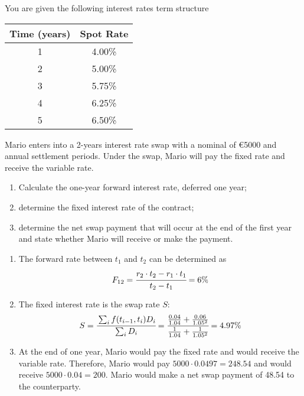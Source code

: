 \documentclass[12pt,a4paper]{exam}
\begin{document}
\begin{questions}
\question You are given the following interest rates term structure
\begin{center}
\begin{tabular}{|c|c|}
\hline
Time (years)& Spot Rate \\ \hline
1 & 4.00\% \\ \hline
2 & 5.00\% \\ \hline
3 & 5.75\% \\ \hline
4 & 6.25\% \\ \hline
5 & 6.50\% \\ \hline
\end{tabular}
\end{center}
Mario enters into a 2-years interest rate swap with a nominal of €5000 and annual settlement periods. Under the swap, Mario will pay the fixed rate and receive the variable rate.
\begin{enumerate}
\item Calculate the one-year forward interest rate, deferred one year;
\item determine the fixed interest rate of the contract;
\item determine the net swap payment that will occur at the end of the first year and state
whether Mario will receive or make the payment.
\end{enumerate}

\fillwithlines{3cm}
\begin{solution}
\begin{enumerate}
\item The forward rate between $t_1$ and $t_2$ can be determined as
\begin{equation*}
F_{12} = \cfrac{r_2\cdot t_2 - r_1\cdot t_1}{t_2 - t_1} = 6\%
\end{equation*}
\item The fixed interest rate is the swap rate $S$:
\begin{equation*}
S = \cfrac{\sum_i f(t_{i-1}, t_i) D_i}{\sum_i D_i} = \cfrac{\frac{0.04}{1.04} + \frac{0.06}{1.05^2}}{\frac{1}{1.04}+\frac{1}{1.05^2}} = 4.97\%
\end{equation*}
\item At the end of one year, Mario would pay the fixed rate and would receive the variable rate. Therefore, Mario would pay $5000\cdot 0.0497 = 248.54$ and would receive $5000\cdot 0.04 = 200$. Mario would make a net swap payment of 48.54 to the counterparty.
\end{enumerate}
\end{solution}


\end{questions}
\end{document}
